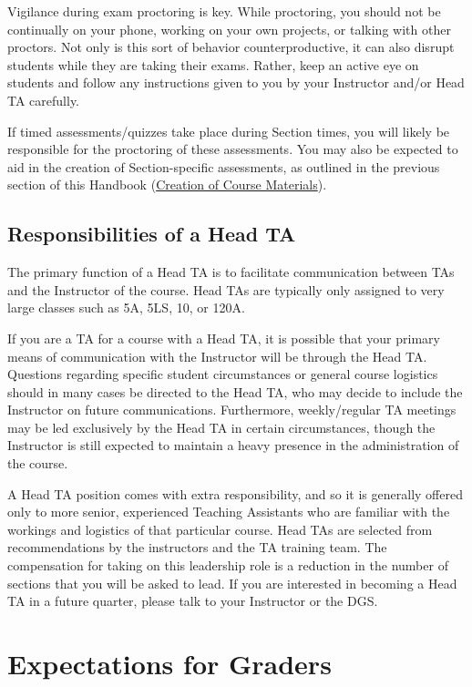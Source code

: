 \documentclass[
  letterpaper,
  DIV=11,
  numbers=noendperiod]{scrreprt}
\begin{document}
Vigilance during exam proctoring is key. While proctoring, you should
not be continually on your phone, working on your own projects, or
talking with other proctors. Not only is this sort of behavior
counterproductive, it can also disrupt students while they are taking
their exams. Rather, keep an active eye on students and follow any
instructions given to you by your Instructor and/or Head TA carefully.

If timed assessments/quizzes take place during Section times, you will
likely be responsible for the proctoring of these assessments. You may
also be expected to aid in the creation of Section-specific assessments,
as outlined in the previous section of this Handbook
(\protect\hyperlink{creation-of-course-materials}{Creation of Course
Materials}).

\hypertarget{responsibilities-of-a-head-ta}{%
\chapter{Responsibilities of a Head
TA}\label{responsibilities-of-a-head-ta}}

The primary function of a Head TA is to facilitate communication between
TAs and the Instructor of the course. Head TAs are typically only
assigned to very large classes such as 5A, 5LS, 10, or 120A.

If you are a TA for a course with a Head TA, it is possible that your
primary means of communication with the Instructor will be through the
Head TA. Questions regarding specific student circumstances or general
course logistics should in many cases be directed to the Head TA, who
may decide to include the Instructor on future communications.
Furthermore, weekly/regular TA meetings may be led exclusively by the
Head TA in certain circumstances, though the Instructor is still
expected to maintain a heavy presence in the administration of the
course.

A Head TA position comes with extra responsibility, and so it is
generally offered only to more senior, experienced Teaching Assistants
who are familiar with the workings and logistics of that particular
course. Head TAs are selected from recommendations by the instructors
and the TA training team. The compensation for taking on this leadership
role is a reduction in the number of sections that you will be asked to
lead. If you are interested in becoming a Head TA in a future quarter,
please talk to your Instructor or the DGS.

\part{\textbf{Expectations for Graders}}
\end{document}
